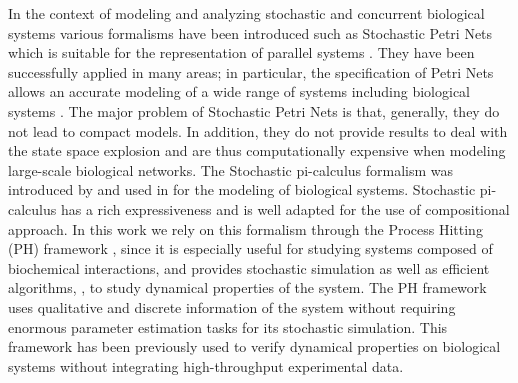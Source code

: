 In the context of modeling and analyzing stochastic and concurrent biological systems various formalisms have been introduced such as 
Stochastic Petri Nets which is suitable for the representation of parallel systems \cite{molloy1982performance}. 
They have been successfully applied in many areas; in particular, the specification of Petri Nets
allows an accurate modeling of a wide range of systems including biological systems \cite{heiner2008petri}. The major 
problem of Stochastic Petri Nets is that, generally, they do not lead to compact models. In addition,
they do not provide results to deal with the state space explosion and are thus computationally
expensive when modeling large-scale biological networks. 
The Stochastic pi-calculus formalism was introduced by \cite{priami1995stochastic} and used in 
\cite{maurin2009modeling} for the modeling of biological systems. Stochastic pi-calculus has a rich
expressiveness and is well adapted for the use of compositional approach.
In this work we rely on this formalism through the Process Hitting (PH) framework \cite{PMR10-TCSB}, 
since it is especially useful for studying systems composed of biochemical interactions, and provides
stochastic simulation as well as efficient algorithms, , to study dynamical properties of the system.
The PH framework uses qualitative and discrete information of the system without requiring enormous parameter estimation tasks
 for its stochastic simulation. 
This framework has been previously used to verify dynamical properties on biological systems without integrating high-throughput experimental data.

